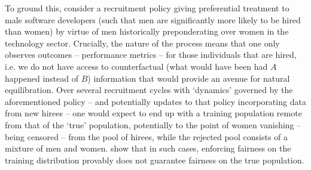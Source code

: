 %
To ground this, consider a recruitment policy giving preferential treatment to male software
developers (such that men are significantly more likely to be hired than women) by virtue of men
historically preponderating over women in the technology sector.
%
Crucially, the nature of the process means that one only observes outcomes -- performance metrics
-- for those individuals that are hired, i.e. we do not have access to counterfactual (what would
have been had \(A\) happened instead of \(B\)) information that would provide an avenue for natural
equilibration.
%
Over several recruitment cycles with `dynamics' governed by the aforementioned policy -- and
potentially updates to that policy incorporating data from new hirees -- one would expect to end up
with a training population remote from that of the `true' population, potentially to the point of
women vanishing -- being censored -- from the pool of hirees, while the rejected pool consists of a
mixture of men and women.
%
\cite{kallus2018residual} show that in such cases, enforcing fairness on the training distribution
provably does not guarantee fairness on the true population.








